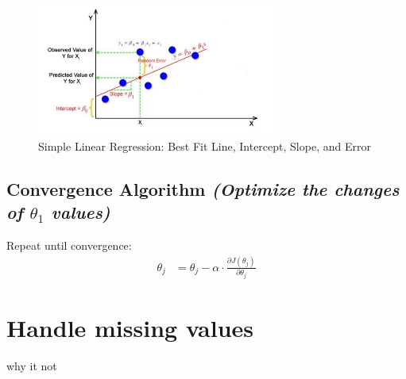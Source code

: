 \documentclass{article}
\begin{document}
\begin{figure}[h!]
    \centering
    \includegraphics[width=0.7\textwidth]{best_fit.png} %
    \caption{Simple Linear Regression: Best Fit Line, Intercept, Slope, and Error}
    \label{fig:linear_regression}
\end{figure}
\vspace{1cm} %

\subsection{Convergence Algorithm \textit{(Optimize the changes of $\theta_1$ values)}}
Repeat until convergence:
\begin{align*}  
    \theta_j &= \theta_j - \alpha \cdot \frac{\partial J(\theta_j)}{\partial \theta_j} 
\end{align*}

\section{Handle missing values}
why it not

\newpage
\end{document}
